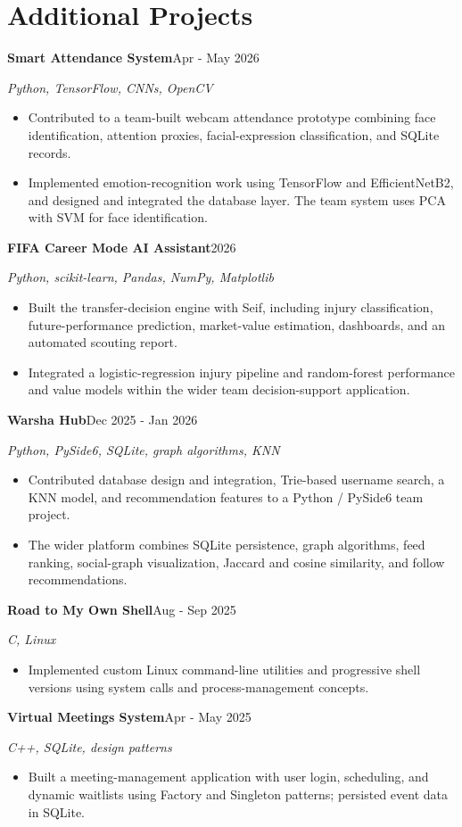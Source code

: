 \documentclass[10pt,a4paper]{article}
\newcommand{\cvitem}[3]{\par\addvspace{4pt}\textbf{#1}\hfill{\small #3}\par{\small\textit{#2}}\par}
\begin{document}
\section*{Additional Projects}
\cvitem{Smart Attendance System}{Python, TensorFlow, CNNs, OpenCV}{Apr - May 2026}
\begin{itemize}
\item Contributed to a team-built webcam attendance prototype combining face identification, attention proxies, facial-expression classification, and SQLite records.
\item Implemented emotion-recognition work using TensorFlow and EfficientNetB2, and designed and integrated the database layer. The team system uses PCA with SVM for face identification.
\end{itemize}
\cvitem{FIFA Career Mode AI Assistant}{Python, scikit-learn, Pandas, NumPy, Matplotlib}{2026}
\begin{itemize}
\item Built the transfer-decision engine with Seif, including injury classification, future-performance prediction, market-value estimation, dashboards, and an automated scouting report.
\item Integrated a logistic-regression injury pipeline and random-forest performance and value models within the wider team decision-support application.
\end{itemize}
\cvitem{Warsha Hub}{Python, PySide6, SQLite, graph algorithms, KNN}{Dec 2025 - Jan 2026}
\begin{itemize}
\item Contributed database design and integration, Trie-based username search, a KNN model, and recommendation features to a Python / PySide6 team project.
\item The wider platform combines SQLite persistence, graph algorithms, feed ranking, social-graph visualization, Jaccard and cosine similarity, and follow recommendations.
\end{itemize}
\cvitem{Road to My Own Shell}{C, Linux}{Aug - Sep 2025}
\begin{itemize}
\item Implemented custom Linux command-line utilities and progressive shell versions using system calls and process-management concepts.
\end{itemize}
\cvitem{Virtual Meetings System}{C++, SQLite, design patterns}{Apr - May 2025}
\begin{itemize}
\item Built a meeting-management application with user login, scheduling, and dynamic waitlists using Factory and Singleton patterns; persisted event data in SQLite.
\end{itemize}
\end{document}

